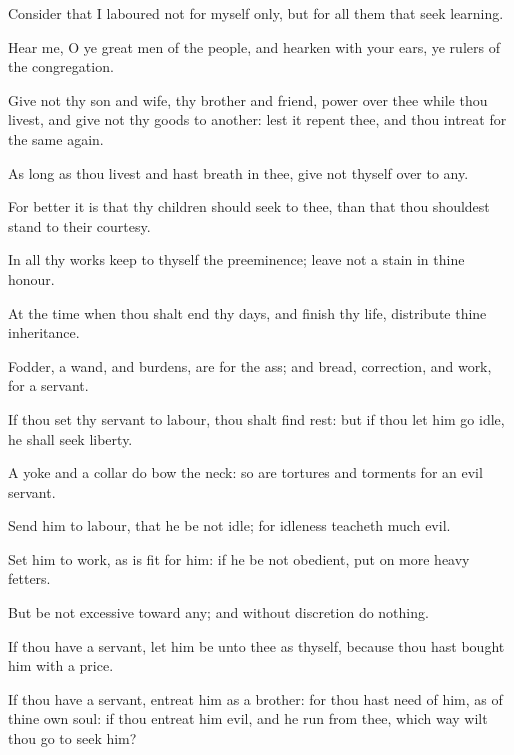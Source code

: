 {\par }{\PP {}Consider that I laboured not for myself only, but for all them that seek learning.
\par }{\PP {}Hear me, O ye great men of the people, and hearken with your ears, ye rulers of the congregation.
\par }{\PP {}Give not thy son and wife, thy brother and friend, power over thee while thou livest, and give not thy goods to another: lest it repent thee, and thou intreat for the same again.
\par }{\PP {}As long as thou livest and hast breath in thee, give not thyself over to any.
\par }{\PP {}For better it is that thy children should seek to thee, than that thou shouldest stand to their courtesy.
\par }{\PP {}In all thy works keep to thyself the preeminence; leave not a stain in thine honour.
\par }{\PP {}At the time when thou shalt end thy days, and finish thy life, distribute thine inheritance.
\par }{\PP {}Fodder, a wand, and burdens, are for the ass; and bread, correction, and work, for a servant.
\par }{\PP {}If thou set thy servant to labour, thou shalt find rest: but if thou let him go idle, he shall seek liberty.
\par }{\PP {}A yoke and a collar do bow the neck: so are tortures and torments for an evil servant.
\par }{\PP {}Send him to labour, that he be not idle; for idleness teacheth much evil.
\par }{\PP {}Set him to work, as is fit for him: if he be not obedient, put on more heavy fetters.
\par }{\PP {}But be not excessive toward any; and without discretion do nothing.
\par }{\PP {}If thou have a servant, let him be unto thee as thyself, because thou hast bought him with a price.
\par }{\PP {}If thou have a servant, entreat him as a brother: for thou hast need of him, as of thine own soul: if thou entreat him evil, and he run from thee, which way wilt thou go to seek him?

}
